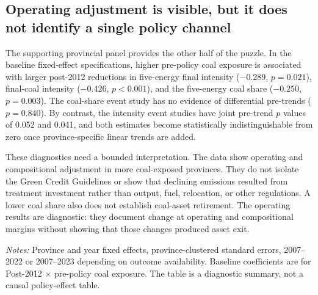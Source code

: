 \documentclass[11pt]{article}
\newcommand{\note}[1]{\begin{minipage}{0.96\textwidth}\footnotesize\textit{Notes:} #1\end{minipage}}
\begin{document}
\subsection{Operating adjustment is visible, but it does not identify a single policy channel}

The supporting provincial panel provides the other half of the puzzle. In the baseline fixed-effect specifications, higher pre-policy coal exposure is associated with larger post-2012 reductions in five-energy final intensity ($-0.289$, $p=0.021$), final-coal intensity ($-0.426$, $p<0.001$), and the five-energy coal share ($-0.250$, $p=0.003$). The coal-share event study has no evidence of differential pre-trends ($p=0.840$). By contrast, the intensity event studies have joint pre-trend $p$ values of 0.052 and 0.041, and both estimates become statistically indistinguishable from zero once province-specific linear trends are added.

These diagnostics need a bounded interpretation. The data show operating and compositional adjustment in more coal-exposed provinces. They do not isolate the Green Credit Guidelines or show that declining emissions resulted from treatment investment rather than output, fuel, relocation, or other regulations. A lower coal share also does not establish coal-asset retirement. The operating results are diagnostic: they document change at operating and compositional margins without showing that those changes produced asset exit.

\begin{table}[H]
\centering
\caption{Supporting provincial evidence: operating and compositional adjustment}
\label{tab:operating}
\note{Province and year fixed effects, province-clustered standard errors, 2007--2022 or 2007--2023 depending on outcome availability. Baseline coefficients are for Post-2012 $\times$ pre-policy coal exposure. The table is a diagnostic summary, not a causal policy-effect table.}
\end{table}
\end{document}
